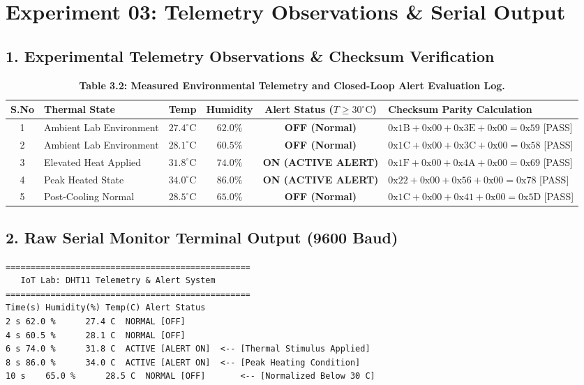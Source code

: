 \documentclass[10pt,a4paper]{article}
\begin{document}
\section*{Experiment 03: Telemetry Observations \& Serial Output}

\subsection*{1. Experimental Telemetry Observations \& Checksum Verification}
\begin{table}[H]
\centering
\small
\renewcommand{\arraystretch}{1.38}
\begin{tabularx}{\textwidth}{|c|p{3.2cm}|c|c|c|X|}
\hline
\textbf{S.No} & \textbf{Thermal State} & \textbf{Temp} & \textbf{Humidity} & \textbf{Alert Status ($T \ge 30^\circ\text{C}$)} & \textbf{Checksum Parity Calculation} \\
\hline
1 & Ambient Lab Environment & $27.4^\circ\text{C}$ & $62.0\%$ & \textbf{OFF (Normal)} & $\text{0x1B} + \text{0x00} + \text{0x3E} + \text{0x00} = \text{0x59}$ [PASS] \\
2 & Ambient Lab Environment & $28.1^\circ\text{C}$ & $60.5\%$ & \textbf{OFF (Normal)} & $\text{0x1C} + \text{0x00} + \text{0x3C} + \text{0x00} = \text{0x58}$ [PASS] \\
3 & Elevated Heat Applied & $31.8^\circ\text{C}$ & $74.0\%$ & \textbf{ON (ACTIVE ALERT)} & $\text{0x1F} + \text{0x00} + \text{0x4A} + \text{0x00} = \text{0x69}$ [PASS] \\
4 & Peak Heated State & $34.0^\circ\text{C}$ & $86.0\%$ & \textbf{ON (ACTIVE ALERT)} & $\text{0x22} + \text{0x00} + \text{0x56} + \text{0x00} = \text{0x78}$ [PASS] \\
5 & Post-Cooling Normal & $28.5^\circ\text{C}$ & $65.0\%$ & \textbf{OFF (Normal)} & $\text{0x1C} + \text{0x00} + \text{0x41} + \text{0x00} = \text{0x5D}$ [PASS] \\
\hline
\end{tabularx}
\caption{\textbf{Table 3.2: Measured Environmental Telemetry and Closed-Loop Alert Evaluation Log.}}
\end{table}

\vspace{0.2cm}
\subsection*{2. Raw Serial Monitor Terminal Output (9600 Baud)}
\begin{lstlisting}[style=bwTerminalPrintLarge, title={\textbf{Serial Monitor Terminal Capture: Raw Telemetry Stream (9600 Baud)}}]
=================================================
   IoT Lab: DHT11 Telemetry & Alert System       
=================================================
Time(s)	Humidity(%)	Temp(C)	Alert Status
2 s	62.0 %		27.4 C	NORMAL [OFF]
4 s	60.5 %		28.1 C	NORMAL [OFF]
6 s	74.0 %		31.8 C	ACTIVE [ALERT ON]  <-- [Thermal Stimulus Applied]
8 s	86.0 %		34.0 C	ACTIVE [ALERT ON]  <-- [Peak Heating Condition]
10 s	65.0 %		28.5 C	NORMAL [OFF]       <-- [Normalized Below 30 C]
\end{lstlisting}
\end{document}
